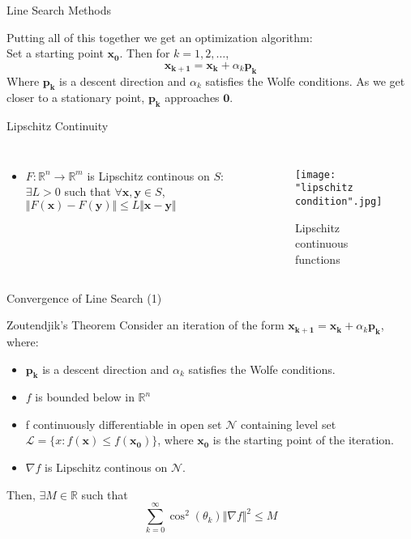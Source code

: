 \documentclass{beamer}
\newcommand{\R}{\mathbb{R}}
\begin{document}
    \begin{frame}{Line Search Methods}
        
        Putting all of this together we get an optimization algorithm: \\
        Set a starting point $\mathbf{x_0}$. Then for $k = 1,2, \ldots$,
        $$ \mathbf{x_{k+1}} = \mathbf{x_k} + \alpha_k\mathbf{p_k}$$
        Where $\mathbf{p_k}$ is a \alert{descent direction} and $\alpha_k$ satisfies the \alert{Wolfe conditions}.
        As we get closer to a \alert{stationary point}, $\mathbf{p_k}$ approaches $\mathbf{0}$.

    \end{frame}

    \begin{frame}{Lipschitz Continuity}
        \begin{columns}

        \begin{itemize}
        \item $F: \R^n \rightarrow \R^m$ is \alert{Lipschitz continous} on $S$: $\exists L > 0$ such that $\forall \mathbf{x}, \mathbf{y} \in S$, $\Vert F(\mathbf{x}) - F(\mathbf{y}) \Vert \leq L\Vert \mathbf{x} - \mathbf{y}\Vert$
        \end{itemize}

        \begin{figure}
            \centering
            \texttt{[image: "lipschitz condition".jpg]}
            \caption{Lipschitz continuous functions}
        \end{figure}


        \end{columns}
    \end{frame}

    \begin{frame}{Convergence of Line Search (1)}
        \begin{block}{Zoutendjik's Theorem}
            Consider an iteration of the form $\mathbf{x_{k+1}} = \mathbf{x_k} + \alpha_k \mathbf{p_k}$, where:
            \begin{itemize} 
                \item $\mathbf{p_k}$ is a \alert{descent direction} and $\alpha_k$ satisfies the \alert{Wolfe conditions}. 
                \item $f$ is bounded below in $\R^n$      
                \item f \alert{continuously differentiable} in open set $\mathcal{N}$ containing level set $\mathcal{L} = \{x: f(\mathbf{x}) \leq f(\mathbf{x_0}) \}$, where $\mathbf{x_0}$ is the starting point of the iteration. 
                \item $\nabla f$ is \alert{Lipschitz continous} on $\mathcal{N}$. 
            \end{itemize}
            Then, $\exists M \in \R$ such that
            $$\sum_{k=0}^{\infty} \cos^2(\theta_k)\Vert \nabla f\Vert^2 \leq M$$ 

        \end{block}
    \end{frame}
\end{document}
